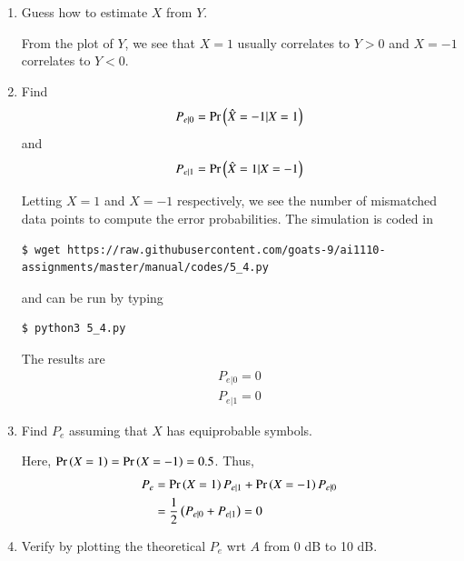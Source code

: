 \documentclass[journal,12pt,twocolumn]{IEEEtran}
\renewcommand\thesection{\arabic{section}}
\begin{document}
\begin{enumerate}[label=\thesection.\arabic*
,ref=\thesection.\theenumi]
\item Guess how to estimate $X$ from $Y$.

\solution
From the plot of $Y$, we see that $X = 1$ usually correlates to $Y > 0$ and $X = -1$ correlates to $Y < 0$.
\item Find 
	\begin{align}
		P_{e|0} = \Pr\left(\hat{X} = -1|X = 1\right)
	\end{align}
and
	\begin{align}
		P_{e|1} = \Pr\left(\hat{X} = 1|X = -1\right)
	\end{align}

\solution
Letting $X = 1$ and $X = -1$ respectively, we see the number of mismatched data points to compute the error probabilities. The simulation is coded in
\begin{lstlisting}
$ wget https://raw.githubusercontent.com/goats-9/ai1110-assignments/master/manual/codes/5_4.py
\end{lstlisting}
and can be run by typing
\begin{lstlisting}
$ python3 5_4.py
\end{lstlisting}
The results are
		\begin{align}
			P_{e|0} = 0 \\
			P_{e|1} = 0
		\end{align}
\item Find $P_e$ assuming that $X$ has equiprobable symbols.

\solution
Here, $\Pr\left(X = 1\right) = \Pr\left(X = -1\right) = 0.5$. Thus,
	\begin{align}
		P_e &= \Pr\left(X = 1\right)P_{e|1} + \Pr\left(X = -1\right)P_{e|0} \label{eq:pe-gen} \\
		&= \frac{1}{2}\left(P_{e|0} + P_{e|1}\right) = 0
	\end{align}
\item Verify by plotting the theoretical $P_e$ wrt $A$ from 0 dB to 10 dB.


\end{enumerate}
\end{document}
